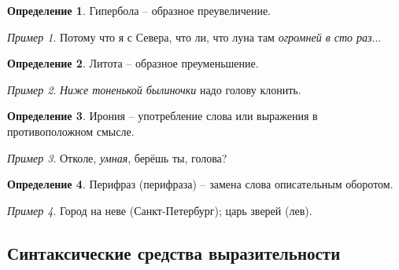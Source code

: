 \documentclass[12pt]{article}
\theoremstyle{definition}
\newtheorem{definition}{Определение}
\theoremstyle{remark}
\newtheorem*{example}{Пример}
\begin{document}
\begin{definition}
    Гипербола -- образное преувеличение.
    \begin{example}
        Потому что я с Севера, что ли, что луна там \textsl{огромней в сто раз}...
    \end{example}
\end{definition}
\begin{definition}
    Литота -- образное преуменьшение.
    \begin{example}
       \textsl{ Ниже тоненькой былиночки} надо голову клонить.
    \end{example}
\end{definition}
\begin{definition}
    Ирония -- употребление слова или выражения в противоположном смысле.
    \begin{example}
        Отколе, \textsl{умная}, берёшь ты, голова?
    \end{example}
\end{definition}
\begin{definition}
    Перифраз (перифраза) -- замена слова описательным оборотом.
    \begin{example}
        Город на неве (Санкт-Петербург); царь зверей (лев).
    \end{example}
\end{definition}

\subsection{Синтаксические средства выразительности}
\end{document}
